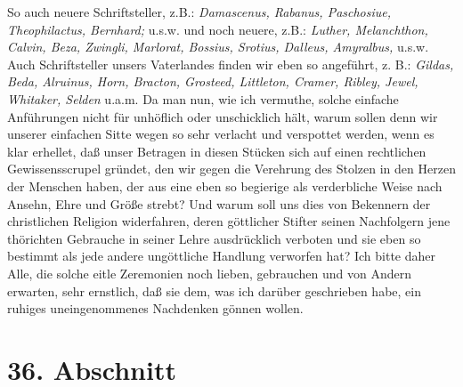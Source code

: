 So auch neuere Schriftsteller, z.B.:
\textit{Damascenus,
Rabanus, Paschosiue,
Theophilactus,
Bernhard;} u.s.w. und noch neuere, z.B.:
\textit{Luther,
Melanchthon,
Calvin, Beza,
Zwingli, Marlorat,
Bossius, Srotius,
Dalleus, Amyralbus,} u.s.w.
Auch Schriftsteller unsers Vaterlandes finden wir eben so angeführt, z. B.:
\textit{Gildas, Beda,
Alruinus, Horn,
Bracton, Grosteed,
Littleton, Cramer,
Ribley,
Jewel, Whitaker,
Selden} u.a.m. Da man nun, wie ich vermuthe, solche
einfache
Anführungen nicht für unhöflich oder unschicklich hält, warum sollen denn wir
unserer einfachen Sitte wegen so sehr verlacht und verspottet werden, wenn es
klar erhellet, daß unser Betragen in diesen Stücken sich auf einen rechtlichen
Gewissensscrupel gründet, den wir gegen die Verehrung des Stolzen in den Herzen
der Menschen haben, der aus eine eben so begierige als verderbliche Weise nach
Ansehn, Ehre und Größe strebt? Und warum soll uns dies von Bekennern der
christlichen Religion widerfahren, deren göttlicher Stifter seinen Nachfolgern
jene thörichten Gebrauche in seiner Lehre ausdrücklich verboten und sie eben so
bestimmt als jede andere ungöttliche Handlung verworfen hat? Ich bitte daher
Alle, die solche eitle Zeremonien noch lieben, gebrauchen und von Andern
erwarten, sehr ernstlich, daß sie dem, was ich darüber geschrieben habe, ein
ruhiges uneingenommenes  Nachdenken gönnen wollen.

\section{36. Abschnitt} \label{kap9_ab36}

